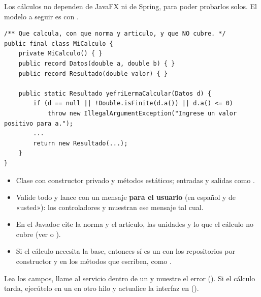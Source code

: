 Los cálculos no dependen de JavaFX ni de Spring, para poder probarlos solos. El modelo a seguir es
 con .

\par\medskip\noindent{}\hspace{0.5em}{\bfseries Escribir el servicio}\par\nopagebreak\smallskip

\begin{verbatim}
/** Que calcula, con que norma y articulo, y que NO cubre. */
public final class MiCalculo {
    private MiCalculo() { }
    public record Datos(double a, double b) { }
    public record Resultado(double valor) { }

    public static Resultado yefriLermaCalcular(Datos d) {
        if (d == null || !Double.isFinite(d.a()) || d.a() <= 0)
            throw new IllegalArgumentException("Ingrese un valor positivo para a.");
        ...
        return new Resultado(...);
    }
}
\end{verbatim}

\begin{itemize}
	\item Clase  con constructor privado y métodos estáticos; entradas y salidas como .
	\item Valide todo y lance  con un mensaje \textbf{para el usuario} (en español y de
	      «usted»): los controladores y  muestran ese mensaje tal cual.
	\item En el Javadoc cite la norma y el artículo, las unidades y lo que el cálculo no cubre (ver
	       o ).
	\item Si el cálculo necesita la base, entonces sí es un  con los repositorios por constructor y
	       en los métodos que escriben, como .
\end{itemize}

\par\medskip\noindent{}\hspace{0.5em}{\bfseries Llamarlo desde el controlador}\par\nopagebreak\smallskip

Lea los campos, llame al servicio dentro de un  y muestre el error (). Si
el cálculo tarda, ejecútelo en un  en otro hilo y actualice la interfaz en
 ().

